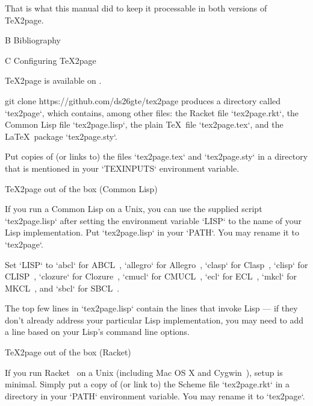 {{{{{{{{{\begintt
\ifx{}
\else
{}\fi
\endtt
That is what this manual did to keep it processable in both versions
of \TeX2page.

\beginchapter  B Bibliography





\beginchapter  C Configuring \TeX2page

%
\TeX2page is available on
.

\begintt
git clone https://github.com/ds26gte/tex2page
\endtt
%
produces a directory
called `tex2page`, which contains, among other files:
the Racket file `tex2page.rkt`, the Common Lisp file `tex2page.lisp`, the plain \TeX\ file
`tex2page.tex`, and the \LaTeX\ package
`tex2page.sty`.

Put copies of (or links to) the files
`tex2page.tex` and `tex2page.sty`  in a directory
that is mentioned in your `TEXINPUTS` environment
variable.

\beginsection \TeX2page out of the box (Common Lisp)

If you run a Common Lisp on a Unix, you can use the supplied script
`tex2page.lisp` after setting the environment variable `LISP` to the
name of your Lisp implementation.  Put `tex2page.lisp` in your
`PATH`. You may rename it to
`tex2page`.

Set `LISP` to
`abcl` for ABCL~\cite{abcl},
`allegro` for Allegro~\cite{allegro},
`clasp` for Clasp~\cite{clasp},
`clisp` for CLISP~\cite{clisp},
`clozure` for Clozure~\cite{clozure},
`cmucl` for CMUCL~\cite{cmucl},
`ecl` for ECL~\cite{ecl},
`mkcl` for MKCL~\cite{mkcl},
and `sbcl` for SBCL~\cite{sbcl}.

The top few lines in `tex2page.lisp` contain the lines
that invoke Lisp —  if they don’t already address your
particular Lisp
implementation, you may need to add a line based on your
Lisp’s command line options.

\beginsection \TeX2page out of the box (Racket)

%
If you run Racket~\cite{racket} on a Unix (including Mac OS X and
Cygwin~\cite{cygwin}), setup is minimal.  Simply put a copy of (or link to) the Scheme
file `tex2page.rkt` in a directory in your `PATH` environment
variable. You may rename it to `tex2page`.

}}}}}}}}}

